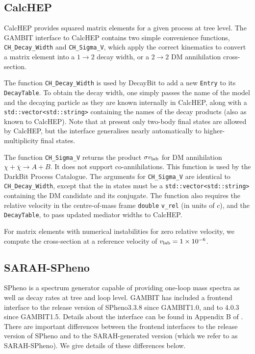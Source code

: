 \documentclass[pdftex,twocolumn,epjc3_preprint,runningheads]{svjour3}
\renewcommand{\_}{\discretionary{\underscore}{}{\underscore}}
\newcommand\cpp[1]{{\lstinline!#1!}}  %
\newcommand{\gambit}{\textsf{GAMBIT}\xspace}
\newcommand{\darkbit}{\textsf{DarkBit}\xspace}
\newcommand{\decaybit}{\textsf{DecayBit}\xspace}
\newcommand{\GB}{\gambit}
\newcommand{\sarah}{\textsf{SARAH}\xspace}
\newcommand{\CH}{\textsf{CalcHEP}\xspace}
\newcommand{\spheno}{\textsf{SPheno}\xspace}
\begin{document}
\subsection{\CH} \label{app:calchep}

\CH provides squared matrix elements for a given process at tree level. The \GB interface to \CH contains two simple convenience functions, \cpp{CH_Decay_Width} and \cpp{CH_Sigma_V}, which apply the correct kinematics to convert a matrix element into a $1\rightarrow2$ decay width, or a $2\rightarrow2$ DM annihilation cross-section.

The function \cpp{CH_Decay_Width} is used by \decaybit to add a new \cpp{Entry} to its \cpp{DecayTable}. To obtain the decay width, one simply passes the name of the model and the decaying particle as they are known internally in \CH, along with a \cpp{std::vector<std::string>} containing the names of the decay products (also as known to \CH).  Note that at present only two-body final states are allowed by \CH, but the interface generalises nearly automatically to higher-multiplicity final states.

The function \cpp{CH_Sigma_V} returns the product $\sigma v_{\rm lab}$ for DM annihilation $\chi + \overline{\chi} \rightarrow A + B$. It does not support co-annihilations.
This function is used by the \darkbit Process Catalogue. The arguments for \cpp{CH_Sigma_V} are identical to \cpp{CH_Decay_Width}, except that the in states must be a \cpp{std::vector<std::string>} containing the DM candidate and its conjugate. The function also requires the relative velocity in the centre-of-mass frame \cpp{double} \cpp{v_rel} (in units of $c$), and the \cpp{DecayTable}, to pass updated mediator widths to \CH.

For matrix elements with numerical instabilities for zero relative velocity, we compute the cross-section at a reference velocity of $v_{\rm lab} = 1 \times 10^{-6}$.

\subsection{\sarah-\spheno} \label{app:spheno}

\spheno is a spectrum generator capable of providing one-loop mass spectra as well as decay rates at tree and loop level. \gambit has included a frontend interface to the release version of \spheno \textsf{3.3.8} since \GB \textsf{1.0}, and to \textsf{4.0.3} since \gambit \textsf{1.5}. Details about the interface can be found in Appendix B of \cite{SDPBit}. There are important differences between the frontend interfaces to the release version of \spheno and to the \sarah-generated version (which we refer to as \sarah-\spheno).  We give details of these differences below.
\end{document}
